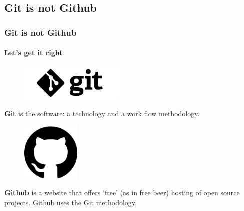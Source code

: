 \documentclass[dvipsnames, usenames]{beamer}
\begin{document}

\subsection{Git is not Github} %
\label{sub:git-not-github}

\begin{frame}[allowframebreaks]
	\frametitle{Git is not Github}
	\framesubtitle{Let's get it right}

	\begin{figure}[h]
		\centering
		\includegraphics[width=0.45\textwidth]{logo}
		\label{fig:git_logo}
	\end{figure}

	\textbf{Git} is the software: a technology and a work flow methodology.

	\framebreak

	\begin{figure}[h]
		\centering
		\includegraphics[width=0.25\textwidth]{octocat}
		\label{fig:github_logo}
	\end{figure}

	\textbf{Github} is a website that offers `free' (as in free beer) hosting of open source projects. Github uses the Git methodology.
\end{frame}


\end{document}
